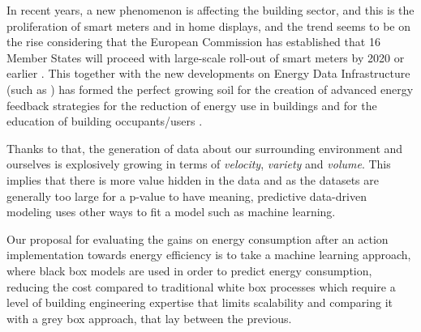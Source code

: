 \documentclass[10pt, conference, compsocconf]{IEEEtran}
\begin{document}
In recent years, a new phenomenon is affecting the building sector, and this is the proliferation of smart meters and in home displays, and the trend seems to be on the rise considering that the European Commission has established that 16 Member States will proceed with large-scale roll-out of smart meters by 2020 or earlier \cite{ec2014report}. This together with the new developments on Energy Data Infrastructure (such as \cite{terroso2017open}) has formed the perfect growing soil for the creation of advanced energy feedback strategies for the reduction of energy use in buildings and for the education of building occupants/users \cite{how2017}.

Thanks to that, the generation of data about our surrounding environment and ourselves is explosively growing in terms of \emph{velocity}, \emph{variety} and \emph{volume}. This implies that there is more value hidden in the data and as the datasets are generally too large for a p-value to have meaning, predictive data-driven modeling uses other ways to fit a model such as machine learning.




Our proposal for evaluating the gains on energy consumption after an action implementation towards energy efficiency is to take a machine learning approach, where black box models are used in order to predict energy consumption, reducing the cost compared to traditional white box processes which require a level of building engineering expertise that limits scalability and comparing it with a grey box approach, that lay between the previous.




\end{document}
